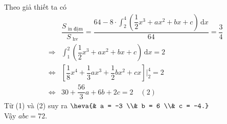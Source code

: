 \begin{bt}
{		Theo giả thiết ta  có
		\begin{eqnarray*}
			&&\dfrac{S_{\text{ in đậm}}}{S_{\text{ hv}}} = \dfrac{64 - 8\cdot \displaystyle\int_{2}^{4} \left(  \dfrac{1}{2}x^3 + ax^2 + bx + c \right)\mathrm{\,d}x}{64} = \dfrac{3}{4}\\
			&\Rightarrow& \displaystyle\int_{1}^{2} \left( \dfrac{1}{2}x^3 + ax^2 + bx + c \right) \mathrm{\,d}x = 2\\ 
			&\Leftrightarrow& \left[\dfrac{1}{8}x^4 + \dfrac{1}{3}ax^3 + \dfrac{1}{2}bx^2  + cx \right]\Big|_{2}^{4} = 2\\
			&\Leftrightarrow&  30 + \dfrac{56}{3}a + 6b + 2c = 2\quad (2)
		\end{eqnarray*}
		Từ  (1) và (2) suy ra $\heva{& a = -3 \\& b = 6 \\& c = -4.}$\\
	 Vậy $abc = 72$.}
\end{bt}


